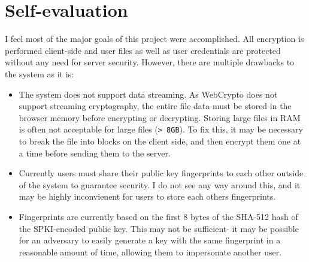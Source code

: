 \documentclass{article}
\begin{document}
\section{Self-evaluation}

I feel most of the major goals of this project were accomplished. All encryption is performed client-side and user files as well as user credentials are protected without any need for server security. However, there are multiple drawbacks to the system as it is:

\begin{itemize}
    \item The system does not support data streaming. As WebCrypto does not support streaming cryptography, the entire file data must be stored in the browser memory before encrypting or decrypting. Storing large files in RAM is often not acceptable for large files (\texttt{> 8GB}). To fix this, it may be necessary to break the file into blocks on the client side, and then encrypt them one at a time before sending them to the server.
    \item Currently users must share their public key fingerprints to each other outside of the system to guarantee security. I do not see any way around this, and it may be highly inconvienent for users to store each others fingerprints. \item Fingerprints are currently based on the first 8 bytes of the SHA-512 hash of the SPKI-encoded public key. This may not be sufficient- it may be possible for an adversary to easily generate a key with the same fingerprint in a reasonable amount of time, allowing them to impersonate another user.
\end{itemize}

\printbibliography
\end{document}
